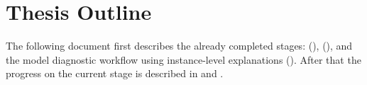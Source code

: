 \section{Thesis Outline}
The following document first describes the already completed stages: \infuse (), \prospector (), and the model diagnostic workflow using instance-level explanations ().
After that the progress on the current stage is described in  and .
